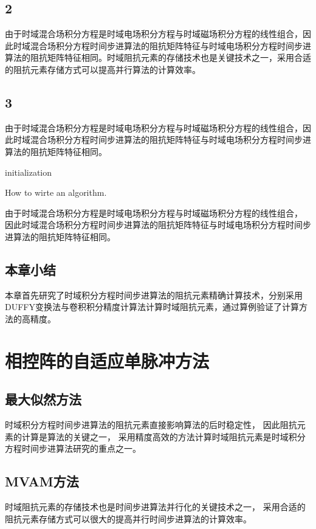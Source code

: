 \documentclass[master]{thesis-uestc}
\begin{document}
\section{2}
由于时域混合场积分方程是时域电场积分方程与时域磁场积分方程的线性组合，因此时域混合场积分方程时间步进算法的阻抗矩阵特征与时域电场积分方程时间步进算法的阻抗矩阵特征相同。时域阻抗元素的存储技术也是关键技术之一，采用合适的阻抗元素存储方式可以提高并行算法的计算效率。

\section{3}
由于时域混合场积分方程是时域电场积分方程与时域磁场积分方程的线性组合，因此时域混合场积分方程时间步进算法的阻抗矩阵特征与时域电场积分方程时间步进算法的阻抗矩阵特征相同。

\begin{algorithm}[H]
    initialization\;
    \caption{How to wirte an algorithm.}
\end{algorithm}

由于时域混合场积分方程是时域电场积分方程与时域磁场积分方程的线性组合，
因此时域混合场积分方程时间步进算法的阻抗矩阵特征与时域电场积分方程时间步进算法的阻抗矩阵特征相同。
\section{本章小结}
本章首先研究了时域积分方程时间步进算法的阻抗元素精确计算技术，分别采用DUFFY变换法与卷积积分精度计算法计算时域阻抗元素，通过算例验证了计算方法的高精度。

\chapter{相控阵的自适应单脉冲方法}
\section{最大似然方法}
时域积分方程时间步进算法的阻抗元素直接影响算法的后时稳定性，
因此阻抗元素的计算是算法的关键之一，
采用精度高效的方法计算时域阻抗元素是时域积分方程时间步进算法研究的重点之一。

\section{MVAM方法}
时域阻抗元素的存储技术也是时间步进算法并行化的关键技术之一，
采用合适的阻抗元素存储方式可以很大的提高并行时间步进算法的计算效率。
\end{document}
